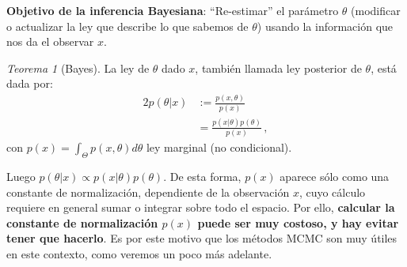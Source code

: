 \documentclass[letterpaper,11pt]{article} %
\theoremstyle{defbreak}
\theoremstyle{propbreak}
\theoremstyle{remark}
\theoremstyle{break}
\newtheorem{theorem}{Teorema}[subsection]
\begin{document}
\textbf{Objetivo de la inferencia Bayesiana}: ``Re-estimar'' el parámetro $\theta$ (modificar o actualizar la ley que describe lo que sabemos de $\theta$) usando la información que nos da el observar $x$.
\begin{theorem}[Bayes]
La ley de $\theta$ dado $x$, también llamada ley posterior de $\theta$, está dada por:
\begin{alignat*}{2}
    p(\theta|x) & := \displaystyle \frac{p(x,\theta)}{p(x)}\\
     & = \displaystyle\frac{p(x|\theta)p(\theta)}{p(x)} \,,
\end{alignat*}
con $p(x)=\displaystyle\int_\Theta p(x,\theta)d\theta$ ley marginal (no condicional).


\end{theorem}
Luego $p(\theta|x)\propto p(x|\theta)p(\theta)$. De esta forma,   $p(x)$ aparece  sólo como una constante de normalización, dependiente de la observaci\'on $x$, cuyo c\'alculo requiere en general sumar o integrar sobre todo el espacio. Por ello,    \textbf{calcular la constante de normalizaci\'on  $p(x)$ puede ser muy costoso,   y hay  evitar tener que hacerlo}.  Es por este motivo que los m\'etodos MCMC son muy \'utiles en este contexto, como veremos un poco m\'as adelante. 
\end{document}
